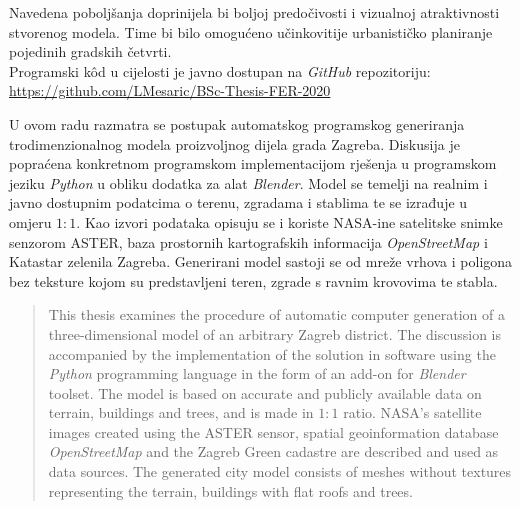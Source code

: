 \documentclass[times, utf8, zavrsni, numeric]{fer}
\begin{document}
	Navedena poboljšanja doprinijela bi boljoj predočivosti i vizualnoj atraktivnosti stvorenog modela.
	Time bi bilo omogućeno učinkovitije urbanističko planiranje pojedinih gradskih četvrti.\\
		
	Programski kôd u cijelosti je javno dostupan na \textit{GitHub} repozitoriju:\\
	\url{https://github.com/LMesaric/BSc-Thesis-FER-2020}








\begin{sazetak}
	
	U ovom radu razmatra se postupak automatskog programskog generiranja trodimenzionalnog modela proizvoljnog dijela grada Zagreba.
	Diskusija je popraćena konkretnom programskom implementacijom rješenja u programskom jeziku \textit{Python} u obliku dodatka za alat \textit{Blender}.
	Model se temelji na realnim i javno dostupnim podatcima o terenu, zgradama i stablima te se izrađuje u omjeru $1:1$.
	Kao izvori podataka opisuju se i koriste NASA-ine satelitske snimke senzorom ASTER, baza prostornih kartografskih informacija \textit{OpenStreetMap} i Katastar zelenila Zagreba.
	Generirani \mbox{model} sastoji se od mreže vrhova i poligona bez teksture kojom su predstavljeni teren, zgrade s ravnim krovovima te stabla.
	
\end{sazetak}


\begin{abstract}
	
	This thesis examines the procedure of automatic computer generation of a three-dimensional model of an arbitrary Zagreb district.
	The discussion is accompanied by the implementation of the solution in software using the \textit{Python} programming language in the form of an add-on for \textit{Blender} toolset.
	The model is based on accurate and publicly available data on terrain, buildings and trees, and is made in $1:1$ ratio.
	NASA's satellite images created using the ASTER sensor, spatial \mbox{geoinformation} \mbox{database} \mbox{\textit{OpenStreetMap}} and the Zagreb Green cadastre are described and used as data sources.
	The generated city model consists of meshes without textures representing the terrain, buildings with flat roofs and trees.
	
\end{abstract}
\end{document}
